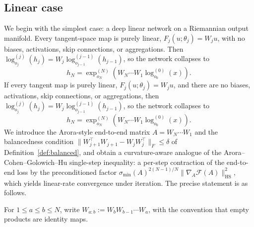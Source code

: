 \documentclass[letterpaper]{article}
\begin{document}
\subsection{Linear case}
\label{sec:main-linear}

We begin with the simplest case: a deep linear network on a Riemannian
output manifold. Every tangent-space map is purely linear,
\(F_j(u;\theta_j)=W_j u\), with no biases, activations, skip
connections, or aggregations. Then
\(\log_{o_j}^{(j)}(h_j) = W_j \log_{o_{j-1}}^{(j-1)}(h_{j-1})\), so
the network collapses to
\[
h_N
=
\exp_{o_N}^{(N)}\!\left(
W_N\cdots W_1\log_{o_0}^{(0)}(x)
\right).
\]
If every tangent map is purely linear, \(F_j(u;\theta_j)=W_ju\), and there
are no biases, activations, skip connections, or aggregations, then
\(\log_{o_j}^{(j)}(h_j) = W_j\log_{o_{j-1}}^{(j-1)}(h_{j-1})\), so the
network collapses to
\[
h_N
=
\exp_{o_N}^{(N)}
\left(
W_N\cdots W_1\log_{o_0}^{(0)}(x)
\right).
\]
We introduce the Arora-style end-to-end matrix
\(A=W_N\cdots W_1\) and the balancedness condition
\(\|W_{j+1}^\top W_{j+1}-W_jW_j^\top\|_F\le \delta\) of
Definition~\ref{def:balanced}, and obtain a curvature-aware analogue of the
Arora--Cohen--Golowich--Hu \cite{arora2018convergence} single-step
inequality: a per-step contraction of the end-to-end loss by the
preconditioned factor
$\sigma_{\min}(A)^{2(N-1)/N}\|\nabla_A \mathcal F(A)\|_{\mathrm{HS}}^2$,
which yields linear-rate convergence under iteration. The precise
statement is as follows.

For \(1\leq a\leq b\leq N\), write \(W_{a:b}:=W_bW_{b-1}\cdots W_a\), with
the convention that empty products are identity maps.
\end{document}
